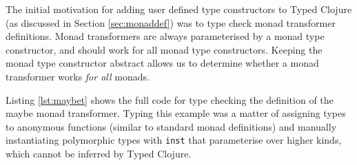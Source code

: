 The initial motivation for adding user defined type constructors to Typed Clojure
(as discussed in Section \ref{sec:monaddef}) was to type check
monad transformer definitions.
Monad transformers are always parameterised by a monad type constructor, and should work for all
monad type constructors. Keeping the monad type constructor abstract allows us to determine
whether a monad transformer works \emph{for all} monads.

Listing \ref{lst:maybet} shows the full code for type checking the definition
of the maybe monad transformer.
Typing this example was a matter of assigning types to anonymous functions
(similar to standard monad definitions) and manually instantiating 
polymorphic types with \lstinline|inst|
that parameterise over higher kinds, which cannot be inferred by Typed Clojure.

